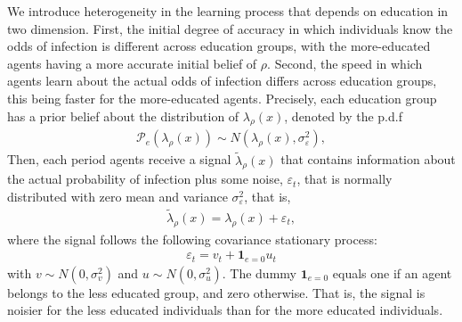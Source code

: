 We introduce heterogeneity in the learning process that depends on education in two dimension. First, the initial degree of accuracy in which individuals know the odds of infection is different across education groups, with the more-educated agents having a more accurate initial belief of $\rho$. Second, the speed in which agents learn about the actual odds of infection differs across education groups, this being faster for the more-educated agents.    %
Precisely, each education group has a prior belief about the distribution of $\lambda_\rho(x)$, denoted by the p.d.f
\begin{align}
    \mathcal{P}_{e}(\lambda_\rho(x))\sim N(\lambda_\rho(x),\sigma^{2}_\varepsilon),
\end{align}
Then, each period agents receive a signal $\widetilde{\lambda}_\rho(x)$ that contains information about the actual probability of infection plus some noise, $\varepsilon_{t}$, that is normally distributed with zero mean and variance $\sigma^{2}_{\varepsilon}$, that is,
\begin{align}
   \widetilde{\lambda}_\rho(x)= \lambda_\rho(x) + \varepsilon_t, %
\end{align}
where the signal follows the following covariance stationary process:
\begin{align}
   \varepsilon_t= v_{t} + \textbf{1}_{e=0} u_t \label{eq:signal} %
\end{align}
with $v\sim N(0,\sigma^{2}_v)$ and $u\sim N(0,\sigma^{2}_u)$. The dummy $\textbf{1}_{e=0}$ equals one if an agent belongs to the less educated group, and zero otherwise. That is, the signal is noisier for the less educated individuals than for the more educated individuals. 

